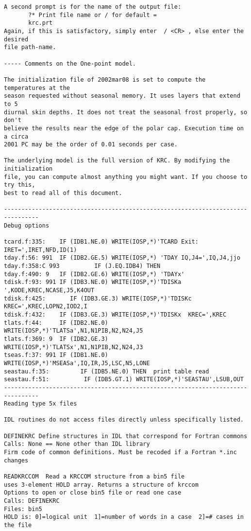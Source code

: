 \begin{verbatim}
A second prompt is for the name of the output file: 
       ?* Print file name or / for default =
       krc.prt     
Again, if this is satisfactory, simply enter  / <CR> , else enter the desired
file path-name.

----- Comments on the One-point model. 

The initialization file of 2002mar08 is set to compute the temperatures at the
season requested without seasonal memory. It uses layers that extend to 5
diurnal skin depths. It does not treat the seasonal frost properly, so don't
believe the results near the edge of the polar cap. Execution time on a circa
2001 PC may be the order of 0.01 seconds per case.

The underlying model is the full version of KRC. By modifying the initialization
file, you can compute almost anything you might want. If you choose to try this,
best to read all of this document.

--------------------------------------------------------------------------------
Debug options

tcard.f:335:    IF (IDB1.NE.0) WRITE(IOSP,*)'TCARD Exit: IRET=',IRET,NFD,ID(1)
tday.f:56: 991  IF (IDB2.GE.5) WRITE(IOSP,*) 'TDAY IQ,J4=',IQ,J4,jjo
tday.f:358:C 993          IF (J.EQ.IDB4) THEN
tday.f:490: 9   IF (IDB2.GE.6) WRITE(IOSP,*) 'TDAYx'
tdisk.f:93: 991 IF (IDB3.NE.0) WRITE(IOSP,*)'TDISKa ',KODE,KREC,NCASE,J5,K4OUT
tdisk.f:425:       IF (IDB3.GE.3) WRITE(IOSP,*)'TDISKc  KREC=',KREC,LOPN2,IOD2,I
tdisk.f:432:    IF (IDB3.GE.3) WRITE(IOSP,*)'TDISKx  KREC=',KREC
tlats.f:44:     IF (IDB2.NE.0) WRITE(IOSP,*)'TLATSa',N1,N1PIB,N2,N24,J5
tlats.f:369: 9  IF (IDB2.GE.3) WRITE(IOSP,*)'TLATSx',N1,N1PIB,N2,N24,J3
tseas.f:37: 991 IF (IDB1.NE.0) WRITE(IOSP,*)'MSEASa',IQ,IR,J5,LSC,N5,LONE
seastau.f:35:         IF (IDB5.NE.0) THEN  print table read
seastau.f:51:          IF (IDB5.GT.1) WRITE(IOSP,*)'SEASTAU',LSUB,OUT
--------------------------------------------------------------------------------
Reading type 5x files

IDL routines do not access files directly unless specifically listed.

DEFINEKRC Define structures in IDL that correspond for Fortran commons
Calls: None == None other than IDL library
Firm code of common definitions. Must be recoded if a Fortran *.inc changes

READKRCCOM  Read a KRCCOM structure from a bin5 file
uses 3-element HOLD array. Returns a structure of krccom
Options to open or close bin5 file or read one case 
Calls: DEFINEKRC
Files: bin5
HOLD is: 0]=logical unit  1]=number of words in a case  2]=# cases in the file 


\end{verbatim}
